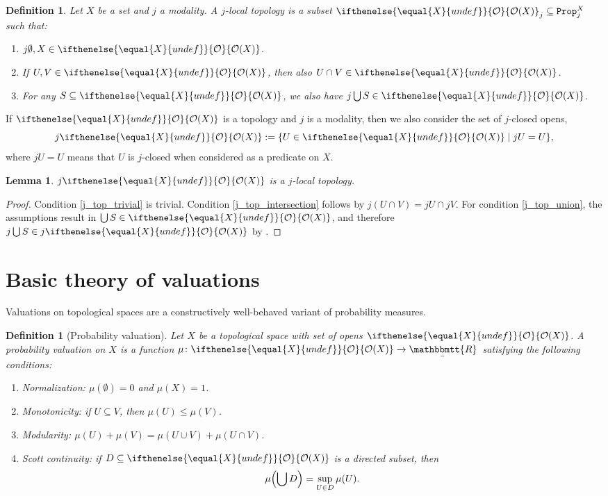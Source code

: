 \documentclass[reqno,11pt]{amsproc}
\theoremstyle{plain}
\newtheorem{lemma}[theorem]{Lemma}
\newtheorem{definition}[theorem]{Definition}
\theoremstyle{definition}
\newcommand{\Const}[1]{\mathtt{#1}}
\renewcommand{\to}[1][]{\xrightarrow{#1}}
\newcommand{\ubar}[1]{\underaccent{\bar}{#1}}
\newcommand{\internal}[1]{\raisebox{-.03ex}{$\mathbbmtt{#1}$}}
\newcommand{\hs}{\hspace{1pt}}
\newcommand{\trr}{\internal{R}}
\newcommand{\tlrr}{\ubar{\trr}\hs}
\newcommand{\prop}{\Const{Prop}}
\newcommand{\Op}[1][undef]{\ifthenelse{\equal{#1}{undef}}{\mathcal{O}}{\mathcal{O}(#1)}}
\let\originalleft\left
\let\originalright\right
\renewcommand{\left}{\mathopen{}\mathclose\bgroup\originalleft}
\renewcommand{\right}{\aftergroup\egroup\originalright}
\newcommand{\beq}{\begin{equation}}
\newcommand{\eeq}{\end{equation}}
\numberwithin{equation}{section}
\begin{document}
\begin{definition}
	Let $X$ be a set and $j$ a modality. A \emph{$j$-local topology} is a subset $\Op[X]_j \subseteq \prop^X_j$ such that:
	\begin{enumerate}
		\item\label{j_top_trivial} $j\emptyset, X \in \Op[X]$.
		\item\label{j_top_intersection} If $U,V \in \Op[X]$, then also $U \cap V \in \Op[X]$.
		\item\label{j_top_union} For any $S \subseteq \Op[X]$, we also have $j\bigcup S \in \Op[X]$.
	\end{enumerate}
\end{definition}

If $\Op[X]$ is a topology and $j$ is a modality, then we also consider the set of $j$-closed opens,
\[
	j \Op[X] := \{ U \in \Op[X] \mid j U = U \},
\]
where $jU = U$ means that $U$ is $j$-closed when considered as a predicate on $X$.

\begin{lemma}
	$j\Op[X]$ is a $j$-local topology.
\end{lemma}

\begin{proof}
	Condition \ref{j_top_trivial} is trivial. Condition \ref{j_top_intersection} follows by $j(U \cap V) = jU \cap jV$. For condition \ref{j_top_union}, the assumptions result in $\bigcup S \in \Op[X]$, and therefore $j \bigcup S \in j \Op[X]$ by .
\end{proof}

\section{Basic theory of valuations}

Valuations on topological spaces are a constructively well-behaved variant of probability measures. 

\begin{definition}[Probability valuation]
	\label{def.prob_valuation}
	Let $X$ be a topological space with set of opens $\Op[X]$. A \emph{probability valuation} on $X$ is a function $\mu \colon \Op[X] \to \tlrr$ satisfying the following conditions:
	\begin{enumerate}
		\item Normalization: $\mu(\emptyset) = 0$ and $\mu(X) = 1$.
		\item Monotonicity: if $U \subseteq V$, then $\mu(U)\le\mu(V)$.
		\item Modularity: $\mu(U)+\mu(V)=\mu(U\cup V)+\mu(U\cap V)$.
		\item Scott continuity: if $D \subseteq \Op[X]$ is a directed subset, then
			\beq
				\label{val_scott}
				\mu \left( \bigcup D \right) = \sup_{U \in D} \mu(U).
			\eeq
	\end{enumerate}
\end{definition}
\end{document}
